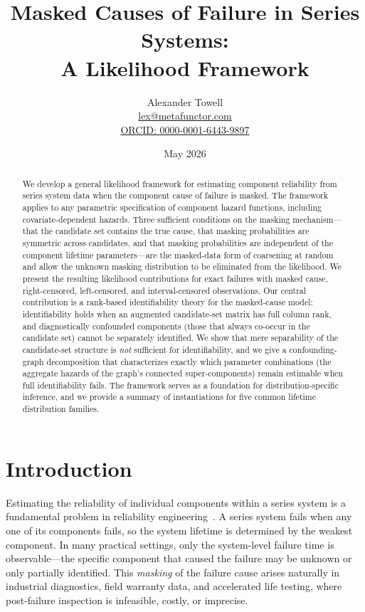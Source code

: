 \documentclass[11pt]{article}
\title{Masked Causes of Failure in Series Systems:\\
A Likelihood Framework}
\author{
    Alexander Towell\\
    \href{mailto:lex@metafunctor.com}{lex@metafunctor.com}\\
    \href{https://orcid.org/0000-0001-6443-9897}{ORCID: 0000-0001-6443-9897}
}
\date{May 2026}
\theoremstyle{definition}
\theoremstyle{plain}
\begin{document}
\maketitle

\begin{abstract}
We develop a general likelihood framework for estimating component reliability
from series system data when the component cause of failure is masked.
The framework applies to any parametric specification of component hazard
functions, including covariate-dependent hazards.
Three sufficient conditions on the masking mechanism---that the candidate set
contains the true cause, that masking probabilities are symmetric across
candidates, and that masking probabilities are independent of the component
lifetime parameters---are the masked-data form of coarsening at random and
allow the unknown masking distribution to be eliminated from the likelihood.
We present the resulting likelihood contributions for exact failures with
masked cause, right-censored, left-censored, and interval-censored observations.
Our central contribution is a rank-based identifiability theory for the
masked-cause model: identifiability holds when an augmented candidate-set
matrix has full column rank, and diagnostically confounded components
(those that always co-occur in the candidate set) cannot be separately
identified.
We show that mere separability of the candidate-set structure is
\emph{not} sufficient for identifiability, and we give a confounding-graph
decomposition that characterizes exactly which parameter combinations
(the aggregate hazards of the graph's connected super-components) remain
estimable when full identifiability fails.
The framework serves as a foundation for distribution-specific inference,
and we provide a summary of instantiations for five common lifetime distribution
families.
\end{abstract}

\section{Introduction}
\label{sec:introduction}

Estimating the reliability of individual components within a series system
is a fundamental problem in reliability engineering~\citep{Agustin-2011}.
A series system fails when any one of its components fails, so the system
lifetime is determined by the weakest component.
In many practical settings, only the system-level failure time is
observable---the specific component that caused the failure may be unknown
or only partially identified.
This \emph{masking} of the failure cause arises naturally in industrial
diagnostics, field warranty data, and accelerated life testing, where
post-failure inspection is infeasible, costly, or imprecise.
\end{document}
